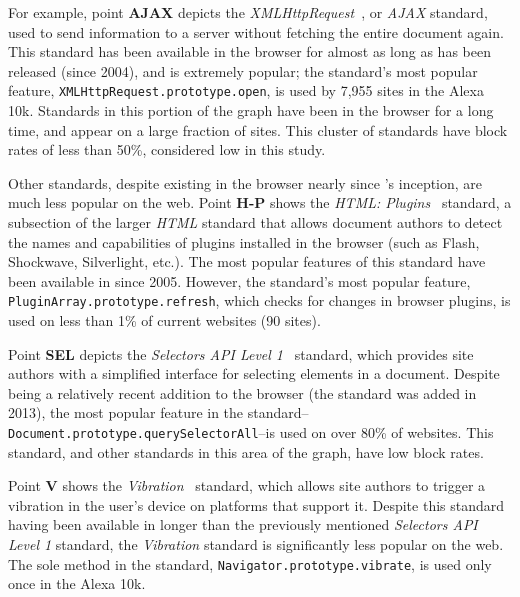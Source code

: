  For example, point \textbf{AJAX}
depicts the \emph{XMLHttpRequest}~\cite{ajaxwhatwg}, or \emph{AJAX} standard,
used to send information to a server without fetching the entire document
again.  This standard has been available in the browser for almost as long as
\FF has been released (since 2004), and is extremely popular; the standard's
most popular feature, \texttt{XMLHttpRequest.prototype.open}, is used by 7,955
sites in the Alexa 10k.  Standards in this portion of the graph have been in
the browser for a long time, and appear on a large fraction of sites.  This
cluster of standards have block rates of less than 50\%, considered low in this
study.

 Other standards, despite existing
in the browser nearly since \FF's inception, are much less popular on the web.
Point \textbf{H-P} shows the \emph{HTML: Plugins}~\cite{htmlpluginsw3c}
standard, a subsection of the larger \emph{HTML} standard that allows document
authors to detect the names and capabilities of plugins installed in the
browser (such as Flash, Shockwave, Silverlight, etc.).  The most popular
features of this standard have been available in \FF since 2005.  However, the
standard's most popular feature, \texttt{PluginArray.prototype.refresh}, which
checks for changes in browser plugins, is used on less than 1\% of current
websites (90 sites).

 Point \textbf{SEL} depicts the
\emph{Selectors API Level 1}~\cite{selectors1w3c} standard, which provides site
authors with a simplified interface for selecting elements in a document.
Despite being a relatively recent addition to the browser (the standard was
added in 2013), the most popular feature in the
standard--\texttt{Document.prototype.querySelectorAll}--is used on over 80\% of
websites.  This standard, and other standards in this area of the graph, have
low block rates.

 Point \textbf{V} shows the
\emph{Vibration}~\cite{vibrationapi} standard, which allows site authors to
trigger a vibration in the user's device on platforms that support it.  Despite
this standard having been available in \FF longer than the previously mentioned
\emph{Selectors API Level 1} standard, the \emph{Vibration} standard is
significantly less popular on the web.  The sole method in the standard,
\texttt{Navigator.prototype.vibrate}, is used only once in the Alexa 10k.


